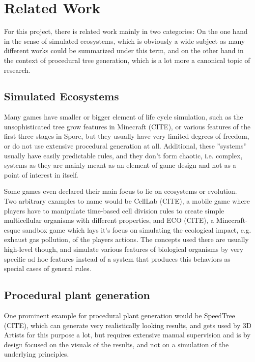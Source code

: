 \documentclass[11pt]{scrartcl}
\begin{document}
\section{Related Work}

For this project, there is related work mainly in two categories: On the one hand in the sense of simulated ecosystems, which is obviously a wide subject as many different works could be summarized under this term, and on the other hand in the context of procedural tree generation, which is a lot more a canonical topic of research.

\subsection{Simulated Ecosystems}

Many games have smaller or bigger element of life cycle simulation, such as the unsophisticated tree grow features in Minecraft (CITE), or various features of the first three stages in Spore, but they usually have very limited degrees of freedom, or do not use extensive procedural generation at all. Additional, these ''systems'' usually have easily predictable rules, and they don't form chaotic, i.e. complex, systems as they are mainly meant as an element of game design and not as a point of interest in itself.

Some games even declared their main focus to lie on ecosystems or evolution. Two arbitrary examples to name would be CellLab (CITE), a mobile game where players have to manipulate time-based cell division rules to create simple multicellular organisms with different properties, and ECO (CITE), a Minecraft-esque sandbox game which lays it's focus on simulating the ecological impact, e.g. exhaust gas pollution, of the players actions. The concepts used there are usually high-level though, and simulate various features of biological organisms by very specific ad hoc features instead of a system that produces this behaviors as special cases of general rules.

\subsection{Procedural plant generation}
One prominent example for procedural plant generation would be SpeedTree (CITE), which can generate very realistically looking results, and gets used by 3D Artists for this purpose a lot, but requires extensive manual supervision and is by design focused on the visuals of the results, and not on a simulation of the underlying principles. 
\end{document}
